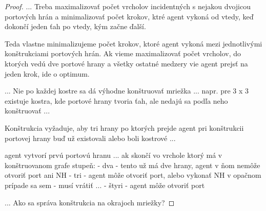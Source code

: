 \begin{proof}
...
Treba maximalizovať počet vrcholov incidentných s nejakou dvojicou portových
 hrán a minimalizovať počet krokov, ktré agent vykoná od vtedy, keď dokončí
jeden ťah po vtedy, kým začne ďalší.

Teda vlastne minimalizujeme počet krokov, ktoré agent vykoná mezi
jednotlivými konštrukciami portových hrán. Ak vieme maximalizovať počet
vrcholov, do ktorých vedú dve portové hrany a všetky ostatné medzery vie
agent prejsť na jeden krok, ide o optimum.

...
Nie po každej kostre sa dá výhodne konštruovať mriežka ...
napr. pre 3 x 3 existuje kostra, kde portové hrany tvoria ťah, ale nedajú sa
podľa neho konštruovať ...

Konštrukcia vyžaduje, aby tri hrany po ktorých prejde agent pri konštrukcii
portovej hrany buď už existovali alebo boli kostrové ...

agent vytvorí prvú portovú hranu ... ak skončí vo vrchole ktorý má v
konštruovanom grafe stupeň:
- dva - tento už má dve hrany, agent v ňom nemôže otvoriť port ani NH
- tri - agent môže otvoriť port, alebo vykonať NH v opačnom prípade sa sem
- musí vrátiť ...
- štyri - agent môže otvoriť port

...
Ako sa správa konštrukcia na okrajoch mriežky?
\fi
\end{proof}
